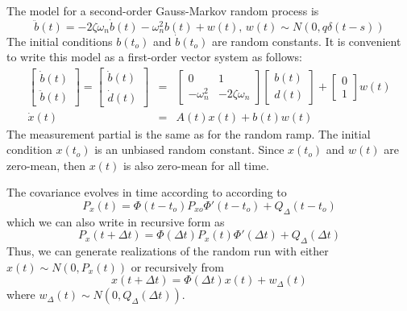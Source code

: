 The model for a second-order Gauss-Markov random process is
\begin{equation}
	\ddot{b}(t) = -2\zeta\omega_n \dot{b}(t) -\omega_n^2 b(t) + w(t), \, w(t) \sim N(0, q\delta(t-s))
\end{equation}
The initial conditions $b(t_o)$ and $\dot{b}(t_o)$ are random constants.  It is convenient to write this model as a first-order vector system as follows:
\begin{eqnarray}
	\begin{bmatrix} \dot{b}(t) \\ \ddot{b}(t) \end{bmatrix} =
	\begin{bmatrix} \dot{b}(t) \\ \dot{d}(t) \end{bmatrix} &=&
	\begin{bmatrix} 0 & 1 \\ -\omega_n^2 & -2\zeta\omega_n \end{bmatrix}
	\begin{bmatrix} b(t) \\ d(t) \end{bmatrix} +
	\begin{bmatrix} 0 \\ 1 \end{bmatrix} w(t) \\
	\dot{x}(t) &=& A(t) x(t) + b(t) w(t)
\end{eqnarray}
The measurement partial is the same as for the random ramp.  The initial condition $x(t_o)$ is an unbiased random constant.  Since $x(t_o)$ and $w(t)$ are zero-mean, then $x(t)$ is also zero-mean for all time.

The covariance evolves in time according to according to
\begin{equation}
	P_x(t) = \Phi(t-t_o)P_{xo}\Phi'(t-t_o) + Q_\Delta(t-t_o)
\end{equation}
which we can also write in recursive form as
\begin{equation}
	P_x(t+\Delta t) = \Phi(\Delta t)P_x(t)\Phi'(\Delta t) + Q_\Delta(\Delta t)
\end{equation}
Thus, we can generate realizations of the random run with either $x(t) \sim N(0, P_x(t))$ or recursively from
\begin{equation}
	x(t+\Delta t) = \Phi(\Delta t) x(t) + w_\Delta(t)
\end{equation}
where $w_\Delta(t) \sim N(0, Q_\Delta(\Delta t))$.

